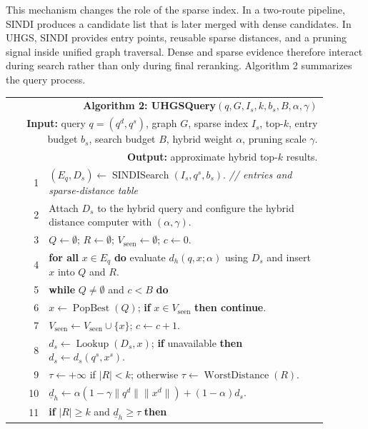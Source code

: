 This mechanism changes the role of the sparse index. In a two-route pipeline, SINDI produces a candidate list that is later merged with dense candidates. In UHGS, SINDI provides entry points, reusable sparse distances, and a pruning signal inside unified graph traversal. Dense and sparse evidence therefore interact during search rather than only during final reranking. Algorithm 2 summarizes the query process.

\begin{center}
\begin{tabular}{r p{0.88\linewidth}}
\hline
\multicolumn{2}{p{0.97\linewidth}}{\textbf{Algorithm 2: UHGSQuery}$(q,G,I_s,k,b_s,B,\alpha,\gamma)$} \\
\multicolumn{2}{p{0.97\linewidth}}{\textbf{Input:} query $q=(q^d,q^s)$, graph $G$, sparse index $I_s$, top-$k$, entry budget $b_s$, search budget $B$, hybrid weight $\alpha$, pruning scale $\gamma$.} \\
\multicolumn{2}{p{0.97\linewidth}}{\textbf{Output:} approximate hybrid top-$k$ results.} \\
\hline
1 & $(E_q,D_s)\leftarrow\operatorname{SINDISearch}(I_s,q^s,b_s)$. \hfill \textit{// entries and sparse-distance table} \\
2 & Attach $D_s$ to the hybrid query and configure the hybrid distance computer with $(\alpha,\gamma)$. \\
3 & $Q\leftarrow\emptyset$; $R\leftarrow\emptyset$; $V_{\mathrm{seen}}\leftarrow\emptyset$; $c\leftarrow0$. \\
4 & \textbf{for all} $x\in E_q$ \textbf{do} evaluate $d_h(q,x;\alpha)$ using $D_s$ and insert $x$ into $Q$ and $R$. \\
5 & \textbf{while} $Q\ne\emptyset$ and $c<B$ \textbf{do} \\
6 & \quad $x\leftarrow\operatorname{PopBest}(Q)$; \textbf{if} $x\in V_{\mathrm{seen}}$ \textbf{then continue}. \\
7 & \quad $V_{\mathrm{seen}}\leftarrow V_{\mathrm{seen}}\cup\{x\}$; $c\leftarrow c+1$. \\
8 & \quad $d_s\leftarrow\operatorname{Lookup}(D_s,x)$; \textbf{if} unavailable \textbf{then} $d_s\leftarrow d_s(q^s,x^s)$. \\
9 & \quad $\tau\leftarrow+\infty$ if $|R|<k$; otherwise $\tau\leftarrow\operatorname{WorstDistance}(R)$. \\
10 & \quad $\underline{d}_h\leftarrow\alpha(1-\gamma\|q^d\|\|x^d\|)+(1-\alpha)d_s$. \\
11 & \quad \textbf{if} $|R|\ge k$ and $\underline{d}_h\ge\tau$ \textbf{then} \\

\end{tabular}
\end{center}
